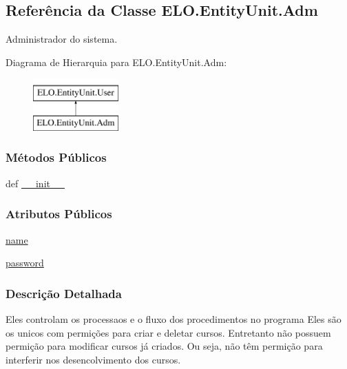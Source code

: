 \hypertarget{classELO_1_1EntityUnit_1_1Adm}{\subsection{Referência da Classe E\-L\-O.\-Entity\-Unit.\-Adm}
\label{classELO_1_1EntityUnit_1_1Adm}
}


Administrador do sistema.  


Diagrama de Hierarquia para E\-L\-O.\-Entity\-Unit.\-Adm\-:\begin{figure}[H]
\begin{center}
\leavevmode
\includegraphics[height=2.000000cm]{d3/d3a/classELO_1_1EntityUnit_1_1Adm}
\end{center}
\end{figure}
\subsubsection*{Métodos Públicos}
\begin{DoxyCompactItemize}
\item 
def \hyperlink{classELO_1_1EntityUnit_1_1Adm_a01e2f40a6af7208831e2b35bf155dc9e}{\-\_\-\-\_\-init\-\_\-\-\_\-}
\end{DoxyCompactItemize}
\subsubsection*{Atributos Públicos}
\begin{DoxyCompactItemize}
\item 
\hyperlink{classELO_1_1EntityUnit_1_1Adm_a12f7aaf17dc6e036186e7757244cd12a}{name}
\item 
\hyperlink{classELO_1_1EntityUnit_1_1Adm_aed97c3f4efa1320ef99b3794b51f8e5e}{password}
\end{DoxyCompactItemize}


\subsubsection{Descrição Detalhada}
Eles controlam os processaos e o fluxo dos procedimentos no programa Eles são os unicos com permições para criar e deletar cursos. Entretanto não possuem permição para modificar cursos já criados. Ou seja, não têm permição para interferir nos desencolvimento dos cursos. 

